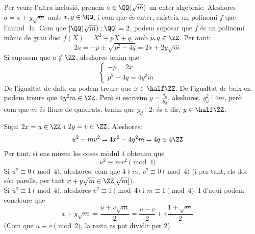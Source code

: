 \documentclass[11pt, a4paper]{article}
\begin{document}
    Per veure l'altra inclusió, prenem $a\in \QQ(\sqrt{m})$ un enter algebraic. Aleshores $a=x+y\sqrt{m}$ amb $x,y\in \QQ$, i com que és enter, existeix un polinomi $f$ que l'annul·la. Com que $[\QQ(\sqrt{m}):\QQ]=2$, podem suposar que $f$ és un polinomi mònic de grau dos: $f(X)=X^2+pX+q$, amb $p,q\in \ZZ$. Per tant:
    \[
        2a=-p\pm\sqrt{p^2-4q}=2x+2y\sqrt{m}
    \]
    Si suposem que $a\notin\ZZ$, aleshores tenim que
    \[
        \begin{cases}
            -p=2x\\
            p^2-4q=4y^2m
        \end{cases}
    \]
    De l'igualtat de dalt, en podem treure que $x\in\half\ZZ$. De l'igualtat de baix en podem treure que $4y^2m\in \ZZ$. Però si escrivim $y=\frac{y_n}{y_d}$, aleshores, $y_d^2\mid 4m$, però com que $m$ és lliure de quadrats, tenim que $y_d\mid 2$: és a dir, $y\in \half\ZZ$.\par
    Sigui $2x=u\in \ZZ$ i $2y=v\in\ZZ$. Aleshores:
    \[
        u^2-mv^2=4x^2-4y^2m=4q\in4\ZZ
    \]
    Per tant, si ens mirem les coses mòdul 4 obtenim que
    \[
    u^2\equiv mv^2\pmod4
    \]
    Si $u^2\equiv 0\pmod 4$, aleshores, com que $4\nmid m$, $v^2\equiv 0\pmod 4$ (i per tant, els dos són parells, per tant $x+y\sqrt{m}\in \ZZ[\sqrt{m}]$).\\
    Si $u^2\equiv 1\pmod 4$, aleshores $v^2\equiv 1\pmod 4$ i $m\equiv1\pmod4$. I d'aquí podem concloure que
    \[
        x+y\sqrt{m}=\frac{u+v\sqrt{m}}{2}=\frac{u-v}{2}+v\frac{1+\sqrt{m}}{2}
    \]
    (Com que $u\equiv v\pmod 2$, la resta es pot dividir per 2).
\end{document}
